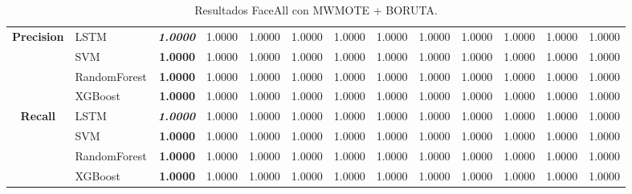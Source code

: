 \begin{table}[H]
\begin{adjustbox}{max width=14cm}
\begin{tabular}{|c|l|r|r|r|r|r|r|r|r|r|r|r|}
			\textbf{Precision} & LSTM &  \textit{\textbf{1.0000}} &  1.0000 &  1.0000 &  1.0000 &  1.0000 &  1.0000 &  1.0000 &  1.0000 &  1.0000 &  1.0000 &  1.0000 \\
			& SVM &  \textbf{1.0000} &  1.0000 &  1.0000 &  1.0000 &  1.0000 &  1.0000 &  1.0000 &  1.0000 &  1.0000 &  1.0000 &  1.0000 \\
			& RandomForest &  \textbf{1.0000} &  1.0000 &  1.0000 &  1.0000 &  1.0000 &  1.0000 &  1.0000 &  1.0000 &  1.0000 &  1.0000 &  1.0000 \\
			& XGBoost &  \textbf{1.0000} &  1.0000 &  1.0000 &  1.0000 &  1.0000 &  1.0000 &  1.0000 &  1.0000 &  1.0000 &  1.0000 &  1.0000 \\
			\hline
			\textbf{Recall} & LSTM &  \textit{\textbf{1.0000}} &  1.0000 &  1.0000 &  1.0000 &  1.0000 &  1.0000 &  1.0000 &  1.0000 &  1.0000 &  1.0000 &  1.0000 \\
			& SVM &  \textbf{1.0000} &  1.0000 &  1.0000 &  1.0000 &  1.0000 &  1.0000 &  1.0000 &  1.0000 &  1.0000 &  1.0000 &  1.0000 \\
			& RandomForest &  \textbf{1.0000} &  1.0000 &  1.0000 &  1.0000 &  1.0000 &  1.0000 &  1.0000 &  1.0000 &  1.0000 &  1.0000 &  1.0000 \\
			& XGBoost &  \textbf{1.0000} &  1.0000 &  1.0000 &  1.0000 &  1.0000 &  1.0000 &  1.0000 &  1.0000 &  1.0000 &  1.0000 &  1.0000 \\
			\hline
			
		\end{tabular}
	\end{adjustbox}	
	\caption{Resultados FaceAll con MWMOTE + BORUTA.}
	\label{tab:faceAllMWMOTEBORUTA}
\end{table}


